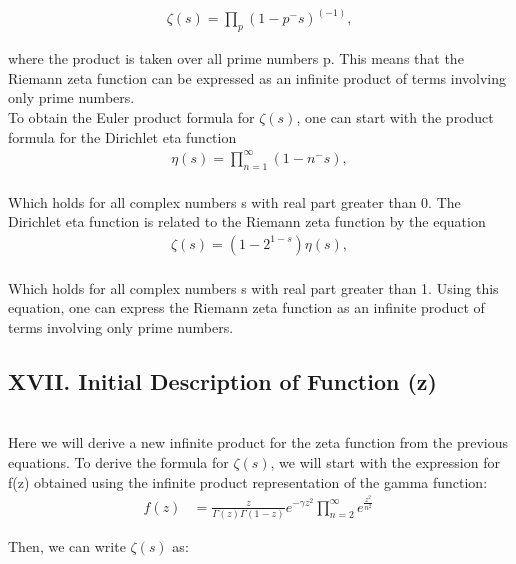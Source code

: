 \documentclass{article}
\begin{document}
\begin{align*}
\zeta(s) = \prod_{p} \left(1 - p^-s\right)^\left(-1\right),
\end{align*}

where the product is taken over all prime numbers p. This means that the Riemann zeta function can be expressed as an infinite product of terms involving only prime numbers. \\

To obtain the Euler product formula for $\zeta\left(s\right)$, one can start with the product formula for the Dirichlet eta function \\

\begin{align*}
\eta(s) = \prod_{n=1}^\infty \left(1 - n^-s\right), \\
\end{align*}

Which holds for all complex numbers s with real part greater than 0. The Dirichlet eta function is related to the Riemann zeta function by the equation \\

\begin{align*}
\zeta(s) = \left(1 - 2^{1-s}\right) \eta\left(s\right), \\
\end{align*}

Which holds for all complex numbers s with real part greater than 1. Using this equation, one can express the Riemann zeta function as an infinite product of terms involving only prime numbers. \\

\subsection*{XVII. Initial Description of Function \zeta(z)} \\
Here we will derive a new infinite product for the zeta function from the previous equations. To derive the formula for $\zeta(s)$, we will start with the expression for f(z) obtained using the infinite product representation of the gamma function: \\

\begin{align*}
f(z) &= \frac{z}{\Gamma(z)\Gamma(1-z)}e^{-\gamma z^2} \prod_{n=2}^{\infty} e^{\frac{z^2}{n^2}} \
\end{align*}

Then, we can write $\zeta(s)$ as:
\end{document}
